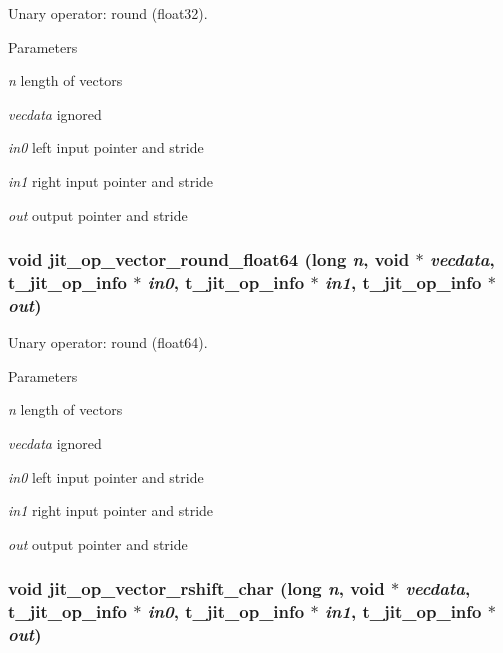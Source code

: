 Unary operator: round (float32). 
\begin{DoxyParams}{Parameters}
\item[{\em n}]length of vectors \item[{\em vecdata}]ignored \item[{\em in0}]left input pointer and stride \item[{\em in1}]right input pointer and stride \item[{\em out}]output pointer and stride \end{DoxyParams}
\hypertarget{group__opvecmod_ga4f3eeb3b5ef9cb726fcb7fb06827528d}{
\subsubsection[{jit\_\-op\_\-vector\_\-round\_\-float64}]{\setlength{\rightskip}{0pt plus 5cm}void jit\_\-op\_\-vector\_\-round\_\-float64 (long {\em n}, \/  void $\ast$ {\em vecdata}, \/  {\bf t\_\-jit\_\-op\_\-info} $\ast$ {\em in0}, \/  {\bf t\_\-jit\_\-op\_\-info} $\ast$ {\em in1}, \/  {\bf t\_\-jit\_\-op\_\-info} $\ast$ {\em out})}}
\label{group__opvecmod_ga4f3eeb3b5ef9cb726fcb7fb06827528d}


Unary operator: round (float64). 
\begin{DoxyParams}{Parameters}
\item[{\em n}]length of vectors \item[{\em vecdata}]ignored \item[{\em in0}]left input pointer and stride \item[{\em in1}]right input pointer and stride \item[{\em out}]output pointer and stride \end{DoxyParams}
\hypertarget{group__opvecmod_ga9566b7501771b726d1d1b740beaa434b}{
\subsubsection[{jit\_\-op\_\-vector\_\-rshift\_\-char}]{\setlength{\rightskip}{0pt plus 5cm}void jit\_\-op\_\-vector\_\-rshift\_\-char (long {\em n}, \/  void $\ast$ {\em vecdata}, \/  {\bf t\_\-jit\_\-op\_\-info} $\ast$ {\em in0}, \/  {\bf t\_\-jit\_\-op\_\-info} $\ast$ {\em in1}, \/  {\bf t\_\-jit\_\-op\_\-info} $\ast$ {\em out})}}
\label{group__opvecmod_ga9566b7501771b726d1d1b740beaa434b}


